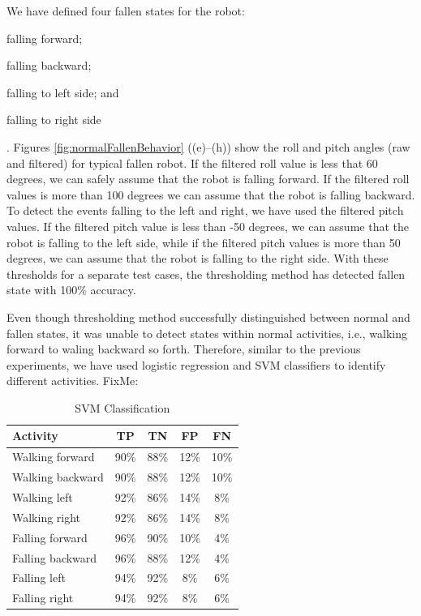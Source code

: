 \documentclass[letterpaper]{article}
\begin{document}
We have defined four fallen states for the robot: \begin{inparaenum}[(1)] \item falling
forward; \item falling backward; \item falling to left side; and \item falling to right
side\end{inparaenum}. Figures \ref{fig:normalFallenBehavior} ((e)--(h)) show the roll and pitch 
angles (raw and filtered) for typical fallen robot. If the filtered roll value is less that 60 
degrees, we can safely assume that the robot is falling forward. If the filtered roll values is 
more than 100 degrees we can assume that the robot is falling backward. To detect the events 
falling to the left and right, we have used the filtered pitch values. If the filtered pitch value 
is less than -50 degrees, we can assume that the robot is falling to the left side, while if the 
filtered pitch values is more than 50 degrees, we can assume that the robot is falling to the right 
side. With these thresholds for a separate test cases, the thresholding method has detected fallen 
state with 100\% accuracy. 


Even though thresholding method successfully distinguished between normal and fallen states, it was 
unable to detect states within normal activities, i.e., walking forward to waling backward so 
forth. Therefore, similar to the previous experiments, we have used logistic regression and SVM 
classifiers to identify different activities. FixMe:


\begin{table}[!ht]
\caption{SVM Classification}
	\label{tab:robot-svm-class}
	\centering
		\begin{tabular} {| l | c | c | c | c | }
		\hline
			{\bf Activity} & {\bf  TP}  &	{\bf TN}  &	{\bf FP} &	{\bf FN} \\ 
\hline
			Walking forward	& 90\%	& 88\%	& 12\%	& 10\% \\ \hline
			Walking backward	& 90\%	& 88\%	& 12\%	& 10\% \\ \hline
			Walking left	& 92\%	& 86\%	& 14\%	& 8\% \\ \hline
			Walking right	& 92\%	& 86\%	& 14\%	& 8\% \\ \hline
			Falling forward	& 96\%	& 90\%	& 10\%	& 4\%	 \\ \hline
			Falling backward	& 96\%	& 88\%	& 12\%	& 4\%	 \\ \hline
			Falling left	& 94\%	& 92\%	& 8\%	& 6\%	 \\ \hline
			Falling right	& 94\%	& 92\%	& 8\%	& 6\%	 \\ \hline
		\end{tabular}
\end{table}
\end{document}
